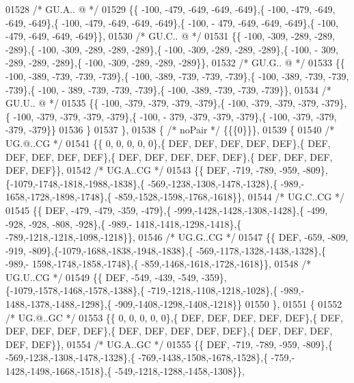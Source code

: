 \begin{DoxyCode}
01528 \textcolor{comment}{/* GU.A.. @ */}
01529 \{\{ -100, -479, -649, -649, -649\},\{ -100, -479, -649, -649, -649\},\{ -100, -479, -649, -649, -649\},\{ -100, -
      479, -649, -649, -649\},\{ -100, -479, -649, -649, -649\}\},
01530 \textcolor{comment}{/* GU.C.. @ */}
01531 \{\{ -100, -309, -289, -289, -289\},\{ -100, -309, -289, -289, -289\},\{ -100, -309, -289, -289, -289\},\{ -100, -
      309, -289, -289, -289\},\{ -100, -309, -289, -289, -289\}\},
01532 \textcolor{comment}{/* GU.G.. @ */}
01533 \{\{ -100, -389, -739, -739, -739\},\{ -100, -389, -739, -739, -739\},\{ -100, -389, -739, -739, -739\},\{ -100, -
      389, -739, -739, -739\},\{ -100, -389, -739, -739, -739\}\},
01534 \textcolor{comment}{/* GU.U.. @ */}
01535 \{\{ -100, -379, -379, -379, -379\},\{ -100, -379, -379, -379, -379\},\{ -100, -379, -379, -379, -379\},\{ -100, -
      379, -379, -379, -379\},\{ -100, -379, -379, -379, -379\}\}
01536 \}
01537 \},
01538 \{ \textcolor{comment}{/* noPair */} \{\{\{0\}\}\},
01539 \{
01540 \textcolor{comment}{/* UG.@..CG */}
01541 \{\{    0,    0,    0,    0,    0\},\{  DEF,  DEF,  DEF,  DEF,  DEF\},\{  DEF,  DEF,  DEF,  DEF,  DEF\},\{  DEF,  
      DEF,  DEF,  DEF,  DEF\},\{  DEF,  DEF,  DEF,  DEF,  DEF\}\},
01542 \textcolor{comment}{/* UG.A..CG */}
01543 \{\{  DEF, -719, -789, -959, -809\},\{-1079,-1748,-1818,-1988,-1838\},\{ -569,-1238,-1308,-1478,-1328\},\{ -989,-
      1658,-1728,-1898,-1748\},\{ -859,-1528,-1598,-1768,-1618\}\},
01544 \textcolor{comment}{/* UG.C..CG */}
01545 \{\{  DEF, -479, -479, -359, -479\},\{ -999,-1428,-1428,-1308,-1428\},\{ -499, -928, -928, -808, -928\},\{ -989,-
      1418,-1418,-1298,-1418\},\{ -789,-1218,-1218,-1098,-1218\}\},
01546 \textcolor{comment}{/* UG.G..CG */}
01547 \{\{  DEF, -659, -809, -919, -809\},\{-1079,-1688,-1838,-1948,-1838\},\{ -569,-1178,-1328,-1438,-1328\},\{ -989,-
      1598,-1748,-1858,-1748\},\{ -859,-1468,-1618,-1728,-1618\}\},
01548 \textcolor{comment}{/* UG.U..CG */}
01549 \{\{  DEF, -549, -439, -549, -359\},\{-1079,-1578,-1468,-1578,-1388\},\{ -719,-1218,-1108,-1218,-1028\},\{ -989,-
      1488,-1378,-1488,-1298\},\{ -909,-1408,-1298,-1408,-1218\}\}
01550 \},
01551 \{
01552 \textcolor{comment}{/* UG.@..GC */}
01553 \{\{    0,    0,    0,    0,    0\},\{  DEF,  DEF,  DEF,  DEF,  DEF\},\{  DEF,  DEF,  DEF,  DEF,  DEF\},\{  DEF,  
      DEF,  DEF,  DEF,  DEF\},\{  DEF,  DEF,  DEF,  DEF,  DEF\}\},
01554 \textcolor{comment}{/* UG.A..GC */}
01555 \{\{  DEF, -719, -789, -959, -809\},\{ -569,-1238,-1308,-1478,-1328\},\{ -769,-1438,-1508,-1678,-1528\},\{ -759,-
      1428,-1498,-1668,-1518\},\{ -549,-1218,-1288,-1458,-1308\}\},

\end{DoxyCode}
